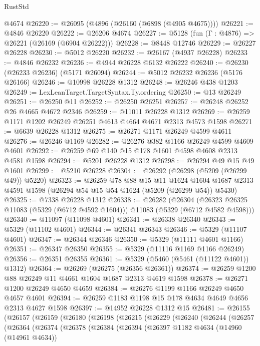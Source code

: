 \begin{lexlean}{RustStd}
\begin{coremodule}
    @4674
@26220 := @26095 (@4896 (@26160 (@6898 (@4905 @4675))))
@26221 := @4846 @26220
@26222 := @26206 @4674
@26227 := @5128 (fun (Γ : @4876) => @26221 (@26169 (@6904 @26222)))
@26228 := @8448 @12746
@26229 := @26227 @26228
@26230 := @5012 @26220
@26232 := @26167 (@4937 @26228)
@26233 := @4846 @26232
@26236 := @4944 @26228 @6132 @26222
@26240 := @26230 (@26233 @26236) (@5171 @26094)
@26244 := @5012 @26232 @26236 (@5176 @26166)
@26246 := @10998 @26228 @1312
@26248 := @26246 @438 @1203
@26249 := LexLeanTarget.TargetSyntax.Ty.ordering
@26250 := @13 @26249
@26251 := @26250 @11
@26252 := @26250 @26251
@26257 := @26248 @26252 @26 @4665 @4672 @2346
@26259 := @11011 @26228 @1312
@26269 := @26259 @1171 @1202 @26249 @26251 @4613 @4664 @4671 @2313 @4573 @1598
@26271 := @6639 @26228 @1312
@26275 := @26271 @1171 @26249 @4599 @4611
@26276 := @26246 @1169
@26282 := @26276 @382 @1166 @26249 @4599 @4609 @4601
@26292 := @26259 @69 @140 @15 @178 @1601 @4598 @4608 @2313 @4581 @1598
@26294 := @5201 @26228 @1312
@26298 := @26294 @49 @15 @49 @1601
@26299 := @5210 @26228
@26304 := @26292 (@26298 (@5209 (@26299 @49)) @5220)
@26323 := @26259
    @78
    @88
    @15
    @11
    @1624
    @1604
    @1687
    @2313
    @4591
    @1598
    (@26294 @54 @15 @54 @1624 (@5209 (@26299 @54)) @5430)
@26325 := @7338 @26228 @1312
@26338 := @26282
    (@26304 (@26323 @26325 @11083 (@5329 (@6712 @4592 @1604))) @11083 (@5329 (@6712 @4582 @4598)))
@26340 := @11097 (@11098 @4601)
@26341 := @26338 @26340
@26343 := @5329 (@11102 @4601)
@26344 := @26341 @26343
@26346 := @5329 (@11107 @4601)
@26347 := @26344 @26346
@26350 := @5329 (@11111 @4601 @1166)
@26351 := @26347 @26350
@26355 := @5329 (@11116 @1169 @1166 @26249)
@26356 := @26351 @26355
@26361 := @5329 (@5460 (@5461 (@11122 @4601)) @1312)
@26364 := @26269 (@26275 (@26356 @26361))
@26374 := @26259 @1200 @88 @26249 @11 @4661 @1604 @1687 @2313 @4619 @1598
@26378 := @26271 @1200 @26249 @4650 @4659
@26384 := @26276 @1199 @1166 @26249 @4650 @4657 @4601
@26394 := @26259 @1183 @1198 @15 @178 @4634 @4649 @4656 @2313 @4627 @1598
@26397 := @14952 @26228 @1312 @15
@26481 := @26155
    (@26157
      (@26159
        (@26180
          (@26198
            (@26215
              (@26229
                (@26240
                  (@26244
                    (@26257
                      (@26364
                        (@26374
                          (@26378
                            (@26384
                              (@26394
                                (@26397
                                  @1182
                                  @4634
                                  (@14960 (@14961 @4634))

\end{coremodule}
\end{lexlean}
